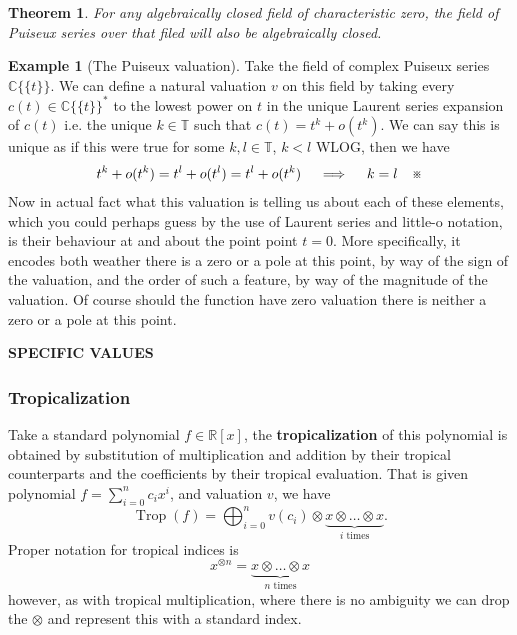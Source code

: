 \documentclass[12pt,a4paper]{amsart}
\newcommand{\trop}[1]{\operatorname{Trop}(#1)}
\newcommand{\R}{\mathbb{R}}
\newcommand{\C}{\mathbb{C}}
\newcommand{\T}{\mathbb{T}}
\newcommand{\K}{\mathbb{K}}
\newcommand{\cont}{\text{\textreferencemark}}
\newtheorem{thm}{Theorem}[section]
\theoremstyle{definition}
\newtheorem{ex}{Example}[section]
\theoremstyle{remark}
\begin{document}

\begin{thm}
For any algebraically closed field of characteristic zero, the field of Puiseux series over that filed will also be algebraically closed.
\end{thm}

\begin{ex}[The Puiseux valuation]
Take the field of complex Puiseux series $\C\{\{ t \}\}$. We can define a natural valuation $v$ on this field by taking every $c(t)\in\C\{\{ t \}\}^*$ to the lowest power on $t$ in the unique Laurent series expansion of $c(t)$ i.e. the unique $k\in\T$ such that $c(t) = t^k + o(t^k)$. We can say this is unique as if this were true for some $k,l\in\T$, $k<l$ WLOG, then we have
\begin{align*}
    t^k + o(t^k) = t^l + o(t^l) = t^l + o(t^k)\quad\implies\quad k = l\quad\cont
\end{align*}
Now in actual fact what this valuation is telling us about each of these elements, which you could perhaps guess by the use of Laurent series and little-o notation, is their behaviour at and about the point point $t=0$. More specifically, it encodes both weather there is a zero or a pole at this point, by way of the sign of the valuation, and the order of such a feature, by way of the magnitude of the valuation. Of course should the function have zero valuation there is neither a zero or a pole at this point.

\textbf{SPECIFIC VALUES}


\end{ex}

\subsubsection{Tropicalization}

Take a standard polynomial $f\in\R[x]$, the \textbf{tropicalization} of this polynomial is obtained by substitution of multiplication and addition by their tropical counterparts and the coefficients by their tropical evaluation. That is given polynomial $f = \sum_{i=0}^n c_ix^i$, and valuation $v$, we have
\begin{equation}
    \trop{f} = \bigoplus_{i=0}^n v(c_i) \otimes \underbrace{x\otimes\dots\otimes x}_\text{$i$ times}.
\end{equation}
Proper notation for tropical indices is
\begin{equation}
    x^{\otimes n} = \underbrace{x\otimes\dots\otimes x}_\text{$n$ times}
\end{equation}
however, as with tropical multiplication, where there is no ambiguity we can drop the $\otimes$ and represent this with a standard index.
\end{document}
